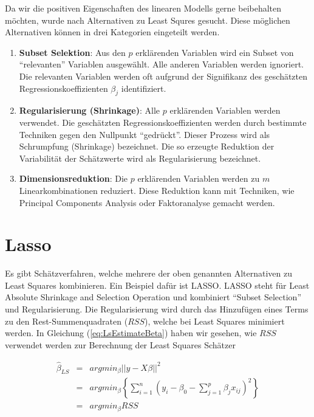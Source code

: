\documentclass[]{book}
\providecommand{\tightlist}{%
  \setlength{\itemsep}{0pt}\setlength{\parskip}{0pt}}
\begin{document}
Da wir die positiven Eigenschaften des linearen Modells gerne
beibehalten möchten, wurde nach Alternativen zu Least Squres gesucht.
Diese möglichen Alternativen können in drei Kategorien eingeteilt
werden.

\begin{enumerate}
\def\labelenumi{\arabic{enumi}.}
\tightlist
\item
  \textbf{Subset Selektion}: Aus den \(p\) erklärenden Variablen wird
  ein Subset von ``relevanten'' Variablen ausgewählt. Alle anderen
  Variablen werden ignoriert. Die relevanten Variablen werden oft
  aufgrund der Signifikanz des geschätzten Regressionskoeffizienten
  \(\beta_j\) identifiziert.
\item
  \textbf{Regularisierung (Shrinkage)}: Alle \(p\) erklärenden Variablen
  werden verwendet. Die geschätzten Regressionskoeffizienten werden
  durch bestimmte Techniken gegen den Nullpunkt ``gedrückt''. Dieser
  Prozess wird als Schrumpfung (Shrinkage) bezeichnet. Die so erzeugte
  Reduktion der Variabilität der Schätzwerte wird als Regularisierung
  bezeichnet.
\item
  \textbf{Dimensionsreduktion}: Die \(p\) erklärenden Variablen werden
  zu \(m\) Linearkombinationen reduziert. Diese Reduktion kann mit
  Techniken, wie Principal Components Analysis oder Faktoranalyse
  gemacht werden.
\end{enumerate}

\section{Lasso}\label{sec-lasso}

Es gibt Schätzverfahren, welche mehrere der oben genannten Alternativen
zu Least Squares kombinieren. Ein Beispiel dafür ist LASSO. LASSO steht
für Least Absolute Shrinkage and Selection Operation und kombiniert
``Subset Selection'' und Regularisierung. Die Regularisierung wird durch
das Hinzufügen eines Terms zu den Rest-Summenquadraten (\(RSS\)), welche
bei Least Squares minimiert werden. In Gleichung
(\ref{eq:LsEstimateBeta}) haben wir gesehen, wie \(RSS\) verwendet
werden zur Berechnung der Least Squares Schätzer

\begin{eqnarray}
\hat{\beta}_{LS} & = & argmin_{\beta}||y - X\beta||^2 \nonumber \\
                     & = & argmin_{\beta} \left\{\sum_{i = 1}^n\left(y_i - \beta_0 - \sum_{j=1}^p \beta_j x_{ij} \right)^2\right\} \nonumber \\
                     & = & argmin_{\beta} RSS
\label{eq:LsEstimateBetaExpandRSS}
\end{eqnarray}
\end{document}

